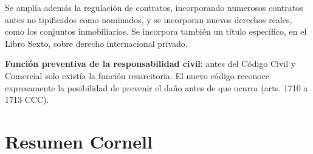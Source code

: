 \documentclass[12pt,oneside]{book}
\begin{document}
Se amplía además la regulación de contratos, incorporando numerosos contratos antes no tipificados como nominados, y se incorporan nuevos derechos reales, como los conjuntos inmobiliarios. Se incorpora también un título específico, en el Libro Sexto, sobre derecho internacional privado.

\begin{important}
\textbf{Función preventiva de la responsabilidad civil}: antes del Código Civil y Comercial solo existía la función resarcitoria. El nuevo código reconoce expresamente la posibilidad de prevenir el daño antes de que ocurra (arts. 1710 a 1713 CCC).
\end{important}


\chapter*{Resumen Cornell}
\end{document}
